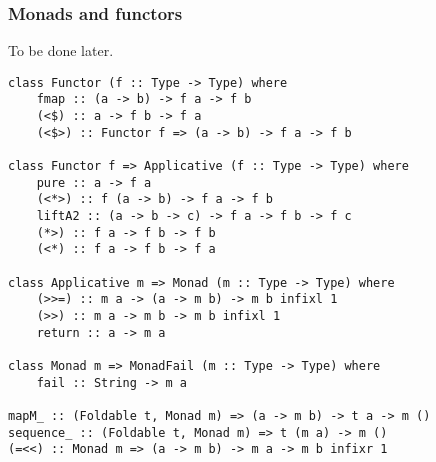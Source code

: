 %

\subsubsection{Monads and functors}
To be done later.
\begin{verbatim}
class Functor (f :: Type -> Type) where
    fmap :: (a -> b) -> f a -> f b
    (<$) :: a -> f b -> f a
    (<$>) :: Functor f => (a -> b) -> f a -> f b

class Functor f => Applicative (f :: Type -> Type) where
    pure :: a -> f a
    (<*>) :: f (a -> b) -> f a -> f b
    liftA2 :: (a -> b -> c) -> f a -> f b -> f c
    (*>) :: f a -> f b -> f b
    (<*) :: f a -> f b -> f a

class Applicative m => Monad (m :: Type -> Type) where
    (>>=) :: m a -> (a -> m b) -> m b infixl 1
    (>>) :: m a -> m b -> m b infixl 1
    return :: a -> m a

class Monad m => MonadFail (m :: Type -> Type) where
    fail :: String -> m a

mapM_ :: (Foldable t, Monad m) => (a -> m b) -> t a -> m ()
sequence_ :: (Foldable t, Monad m) => t (m a) -> m ()
(=<<) :: Monad m => (a -> m b) -> m a -> m b infixr 1
\end{verbatim}

%